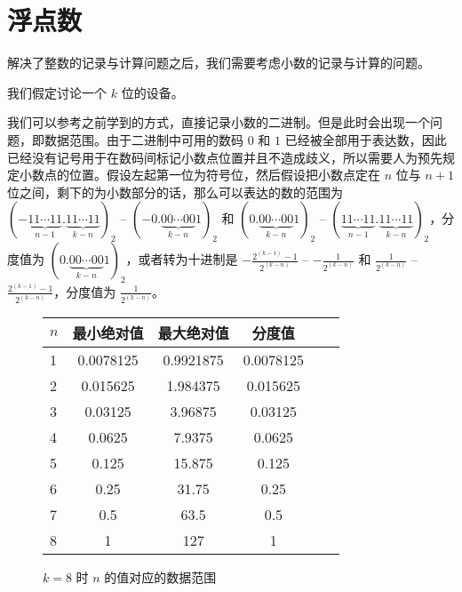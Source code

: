 \section{浮点数}\label{sec:NumberSystemBasics/floating-point}
    解决了整数的记录与计算问题之后，我们需要考虑小数的记录与计算的问题。

    我们假定讨论一个 $k$ 位的设备。

    我们可以参考之前学到的方式，直接记录小数的二进制。但是此时会出现一个问题，即数据范围。由于二进制中可用的数码 $0$ 和 $1$ 已经被全部用于表达数，因此已经没有记号用于在数码间标记小数点位置并且不造成歧义，所以需要人为预先规定小数点的位置。假设左起第一位为符号位，然后假设把小数点定在 $n$ 位与 $n + 1$ 位之间，剩下的为小数部分的话，那么可以表达的数的范围为 $(-\underbrace{11 \cdots 11}_{n-1}.\underbrace{11 \cdots 11}_{k-n})_2$ -- $(-0.\underbrace{00 \cdots 00}_{k-n}1)_2$ 和 $(0.\underbrace{00 \cdots 00}_{k-n}1)_2$ -- $(\underbrace{11 \cdots 11}_{n-1}.\underbrace{11 \cdots 11}_{k-n})_2$，分度值为 $(0.\underbrace{00 \cdots 00}_{k-n}1)_2$，或者转为十进制是 $-\frac{2^{(k-1)}-1}{2^{(k-n)}}$ -- $-\frac{1}{2^{(k-n)}}$ 和 $\frac{1}{2^{(k-n)}}$ -- $\frac{2^{(k-1)}-1}{2^{(k-n)}}$，分度值为 $\frac{1}{2^{(k-n)}}$。

    \begin{figure}
        \centering
        \begin{tabular}{lS[table-format=-3.7]S[table-format=-3.7]S[table-format=-3.7]S[table-format=-3.7]S[table-format=-3.7]}
            $n$ & 最小绝对值 & 最大绝对值 & 分度值    \\    & 0.0078125  & 0.9921875  & 0.0078125 \\
            2   & 0.015625   & 1.984375   & 0.015625  \\
            3   & 0.03125    & 3.96875    & 0.03125   \\
            4   & 0.0625     & 7.9375     & 0.0625    \\
            5   & 0.125      & 15.875     & 0.125     \\
            6   & 0.25       & 31.75      & 0.25      \\
            7   & 0.5        & 63.5       & 0.5       \\
            8   & 1          & 127        & 1         \\
        \end{tabular}
        \caption{$k = 8$ 时 $n$ 的值对应的数据范围}
        \label{fig:NumberSystemBasics/floating-point/data-range}
    \end{figure}
